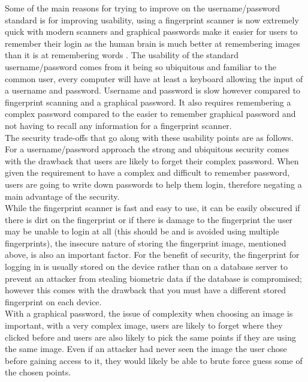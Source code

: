\documentclass{ueacmpstyle}
\begin{document}
    Some of the main reasons for trying to improve on the username/password standard is for 
    improving usability, using a fingerprint scanner is now extremely quick with modern scanners 
    and graphical passwords make it easier for users to remember their login as the human 
    brain is much better at remembering images than it is at remembering words \citep{Grady2703}.
    The usability of the standard username/password comes from it being so ubiquitous and 
    familiar to the common user, every computer will have at least a keyboard allowing 
    the input of a username and password. Username and password is slow however compared to 
    fingerprint scanning and a graphical password. It also requires remembering a complex 
    password compared to the easier to remember graphical password and not having to recall 
    any information for a fingerprint scanner. 
    \\
    The security trade-offs that go along with these usability points are as follows. For 
    a username/password approach the strong and ubiquitous security comes with the drawback 
    that users are likely to forget their complex password. When given the requirement to 
    have a complex and difficult to remember password, users are going to write down 
    passwords to help them login, therefore negating a main advantage of the security.    
    \\
    While the fingerprint scanner is fast and easy to use, it can be easily obscured if 
    there is dirt on the fingerprint or if there is damage to the fingerprint the user may 
    be unable to login at all (this should be and is avoided using multiple fingerprints), 
    the insecure nature of storing the fingerprint image, mentioned above, is also an 
    important factor. 
    For the benefit of security, the fingerprint for logging in is usually stored on the device 
    rather than on a database server to prevent an attacker from stealing biometric data if 
    the database is compromised; however this comes with the drawback that you must have a 
    different stored fingerprint on each device. 
    \\ 
    With a graphical password, the issue of complexity when choosing an image is important, 
    with a very complex image, users are likely to forget where they clicked before and users 
    are also likely to pick the same points if they are using the same image. Even if an 
    attacker had never seen the image the user chose before gaining access to it, they would 
    likely be able to brute force guess some of the chosen points.
\end{document}
